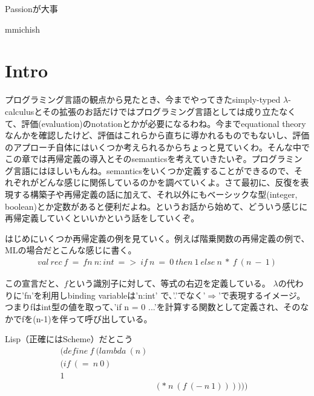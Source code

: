 \documentclass[9pt,fleqn]{jarticle}
\begin{document}
\pagestyle{empty}

\begin{center}
	\LARGE{Passionが大事}\\
\end{center}
\begin{flushright}
	\large{mmichish}
\end{flushright}


\section{Intro}

プログラミング言語の観点から見たとき、今までやってきたsimply-typed $\lambda$-calculusとその拡張のお話だけではプログラミング言語としては成り立たなくて、評価(evaluation)のnotationとかが必要になるわね。今までequational theoryなんかを確認したけど、評価はこれらから直ちに導かれるものでもないし、評価のアプローチ自体にはいくつか考えられるからちょっと見ていくわ。そんな中でこの章では再帰定義の導入とそのsemanticsを考えていきたいぞ。プログラミング言語にはほしいもんね。semanticsをいくつか定義することができるので、それぞれがどんな感じに関係しているのかを調べていくよ。さて最初に、反復を表現する構築子や再帰定義の話に加えて、それ以外にもベーシックな型(integer, boolean)とか定数があると便利だよね。というお話から始めて、どういう感じに再帰定義していくといいかという話をしていくぞ。

\nl
はじめにいくつか再帰定義の例を見ていく。例えば階乗関数の再帰定義の例で、MLの場合だとこんな感じに書く。
\begin{eqnarray}
	val\ rec\ f\ =\ fn\ n:int\ =>\ if\ n\ =\ 0\ then\ 1\ else\ n\ *\ f\ (n\ -\ 1) \nonumber
\end{eqnarray}

この宣言だと、$f$という識別子に対して、等式の右辺を定義している。
$\lambda$の代わりに'fn'を利用しbinding variableは'n:int' で、'.'でなく'$\Rightarrow$'で表現するイメージ。
つまりfはint型の値を取って、'if n = 0 ...'を計算する関数として定義され、そのなかでfを(n-1)を伴って呼び出している。

Lisp（正確にはScheme）だとこう
\begin{eqnarray*}
	(define\ f\ (lambda\ (n) & & \\
	(if\ (=\ n\ 0) & & \\
	1 & & \\
	& (*\ n\ (f\ (-\ n\ 1)))))) &
\end{eqnarray*}
\end{document}
